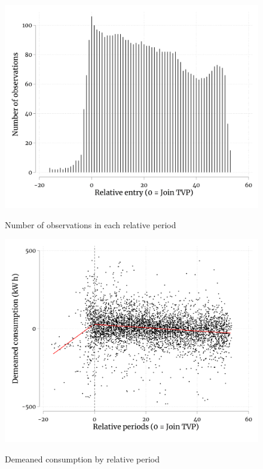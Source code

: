 \FloatBarrier

\begin{figure}[ht]
  \caption{Number of observations in each relative period}\label{fig:ten}
  \begin{center}
  {\includegraphics[width=1\textwidth]{./figures/outInNPeriods.png}}
  \end{center}
\end{figure}

\FloatBarrier

\begin{figure}[ht]
  \caption{Demeaned consumption by relative period}\label{fig:eleven}
  \begin{center}
  {\includegraphics[width=1\textwidth]{./figures/outInScatter.png}}
  \end{center}
\end{figure}

\FloatBarrier
